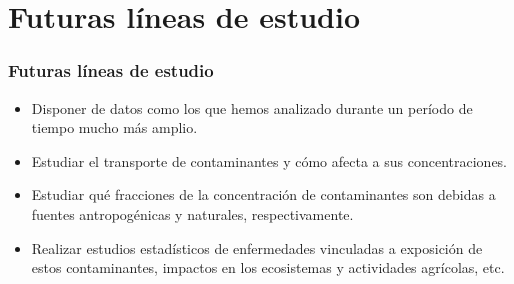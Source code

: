 \documentclass[12pt]{beamer}
\begin{document}
\section{Futuras líneas de estudio}
\begin{frame}
\frametitle{Futuras líneas de estudio}
\begin{itemize}
\item<1-> Disponer de datos como los que hemos analizado durante un período de tiempo mucho más amplio.
\item<2-> Estudiar el transporte de contaminantes y cómo afecta a sus concentraciones.
\item<3-> Estudiar qué fracciones de la concentración de contaminantes son debidas a fuentes antropogénicas y naturales, respectivamente.
\item<4-> Realizar estudios estadísticos de enfermedades vinculadas a exposición de estos contaminantes, impactos en los ecosistemas y actividades agrícolas, etc.
\end{itemize}
\end{frame}
\end{document}
